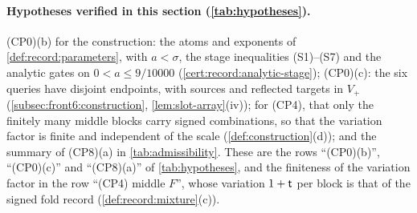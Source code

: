\paragraph{Hypotheses verified in this section (\cref{tab:hypotheses}).}
(CP0)(b) for the construction: the atoms and exponents of
\cref{def:record:parameters}, with $a<\sigma$, the stage inequalities (S1)--(S7)
and the analytic gates on $0<a\le9/10000$ (\cref{cert:record:analytic-stage});
(CP0)(c): the six queries have disjoint endpoints, with sources and reflected
targets in $V_+$ (\cref{subsec:front6:construction}, \cref{lem:slot-array}(iv));
for (CP4), that only the finitely many middle blocks carry signed combinations,
so that the variation factor is finite and independent of the scale
(\cref{def:construction}(d)); and the summary of (CP8)(a) in
\cref{tab:admissibility}. These are the rows ``(CP0)(b)'', ``(CP0)(c)'' and
``(CP8)(a)'' of \cref{tab:hypotheses}, and the finiteness of the variation
factor in the row ``(CP4) middle $F$'', whose variation $1+\mathsf t$ per block is
that of the signed fold record (\cref{def:record:mixture}(c)).
